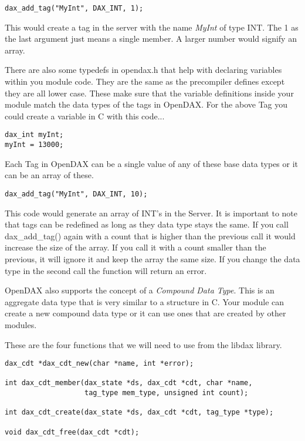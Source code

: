 \begin{verbatim}
dax_add_tag("MyInt", DAX_INT, 1);
\end{verbatim}

This would create a tag in the server with the name \textit{MyInt} of type INT.  The 1 as the last argument just means a single member.  A larger number would signify an array.

There are also some typedefs in opendax.h that help with declaring variables within you module code.  They are the same as the precompiler defines except they are all lower case.  These make sure that the variable definitions inside your module match the data types of the tags in OpenDAX.  For the above Tag you could create a variable in C with this code...

\begin{verbatim}
dax_int myInt;
myInt = 13000;
\end{verbatim}

Each Tag in OpenDAX can be a single value of any of these base data types or it can be an array of these.  

\begin{verbatim}
dax_add_tag("MyInt", DAX_INT, 10);
\end{verbatim}

This code would generate an array of INT's in the Server.  It is important to note that tags can be redefined as long as they data type stays the same.  If you call dax\_add\_tag() again with a count that is higher than the previous call it would increase the size of the array.  If you call it with a count smaller than the previous, it will ignore it and keep the array the same size.  If you change the data type in the second call the function will return an error.

OpenDAX also supports the concept of a \textit{Compound Data Type}.  This is an aggregate data type that is very similar to a structure in C.  Your module can create a new compound data type or it can use ones that are created by other modules.

These are the four functions that we will need to use from the libdax library.

\begin{verbatim}
dax_cdt *dax_cdt_new(char *name, int *error);

int dax_cdt_member(dax_state *ds, dax_cdt *cdt, char *name,
                   tag_type mem_type, unsigned int count);

int dax_cdt_create(dax_state *ds, dax_cdt *cdt, tag_type *type);

void dax_cdt_free(dax_cdt *cdt);
\end{verbatim}

